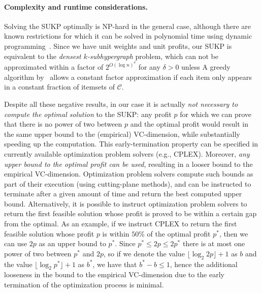 \paragraph{Complexity and runtime considerations.} Solving the SUKP optimally
is NP-hard in the general case, although there are known restrictions for which
it can be solved in polynomial time using dynamic
programming~\citep{GoldschmidtNY94}. Since we have unit weights and unit
profits, our SUKP is equivalent to the \emph{densest $k$-subhypergraph} problem,
which can not be approximated within a factor of $2^{O(\log n)^\delta}$ for any
$\delta>0$ unless 
 A greedy algorithm
by~\citet{Arulselvan14} allows a constant factor approximation if each item only
appears in a constant fraction of itemsets of $\mathcal{C}$.

Despite all these negative results, in our case it is actually \emph{not
necessary to compute the optimal solution} to the SUKP: any profit $p$ for which
we can prove that there is no power of two between $p$ and the optimal profit
would result in the same upper bound to the (empirical) VC-dimension, while
substantially speeding up the computation. This early-termination property can
be specified in currently available optimization problem solvers (e.g., CPLEX).
Moreover, \emph{any upper bound to the optimal profit can be used}, resulting in
a looser bound to the empirical VC-dimension. Optimization problem solvers
compute such bounds as part of their execution (using cutting-plane methods),
and can be instructed to terminate after a given amount of time and return the
best computed upper bound. Alternatively, it is possible to instruct
optimization problem solvers to return the first feasible solution whose profit
is proved to be within a certain gap from the optimal. As an example, if we
instruct CPLEX to return the first feasible solution whose profit $p$ is within
$50\%$ of the optimal profit $p^*$, then we can use $2p$ as an upper bound to
$p^*$. Since $p^*\le 2p\le 2p^*$ there is at most one power of two between $p^*$
and $2p$, so if we denote the value $\lfloor\log_2 2p\rfloor +1$ as $b$ and the
value $\lfloor\log_2 p^*\rfloor +1$ as $b^*$, we have that $b^*-b\le 1$, hence
the additional looseness in the bound to the empirical VC-dimension due to the
early termination of the optimization process is minimal.

